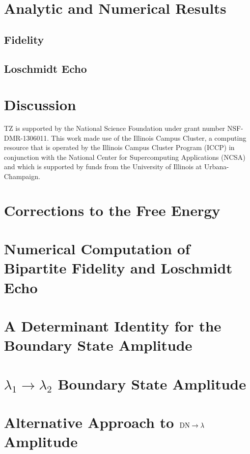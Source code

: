 \documentclass[preprint, prb]{revtex4-1}
\begin{document}
\section{Analytic and Numerical Results}
\subsection{Fidelity}
\subsection{Loschmidt Echo}

\section{Discussion}


\begin{acknowledgments}
    TZ is supported by the National Science Foundation under grant number NSF-DMR-1306011.
    This work made use of the Illinois Campus Cluster, a computing resource that is operated by the
    Illinois Campus Cluster Program (ICCP) in conjunction with the National Center for
    Supercomputing Applications (NCSA) and which is supported by funds from the University of
    Illinois at Urbana-Champaign.
\end{acknowledgments}

\appendix
\section{Corrections to the Free Energy}

\section{Numerical Computation of Bipartite Fidelity and Loschmidt Echo}

\section{A Determinant Identity for the Boundary State Amplitude}
\label{app:pf_of_id}


\section{$\lambda_1 \rightarrow \lambda_2$ Boundary State Amplitude}
\label{app:lambda_12}


\section{Alternative Approach to ${\rm DN} \rightarrow \lambda$ Amplitude}
\label{app:gnd_dn_lambda}




\end{document}
